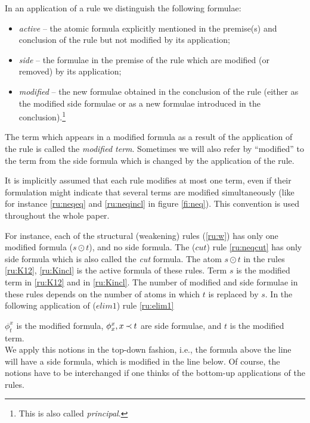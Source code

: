 \begin{DEFINITION} In an application of a rule we distinguish the following
formulae:
\begin{itemize}\MyLPar
\item {\em active} -- the atomic formula explicitly mentioned in the premise(s)
and conclusion of the rule but not modified by its application;
\item {\em side} -- the formulae in the premise of the rule which are modified
(or removed) by its application;
\item {\em modified} -- the new formulae obtained in the conclusion of the rule
(either as the modified side formulae or as a new formulae introduced in the 
conclusion).\footnote{This is also called {\em principal}.}
\end{itemize}
\end{DEFINITION}
\noindent
The term which appears in a modified formula as a 
result of the application of the rule is called the {\em modified
term}. Sometimes we will also refer by ``modified'' to the term from the side
formula which is changed by the application of the rule.

It is implicitly assumed that each rule modifies at most one term, even if
their formulation might indicate that several terms are modified
simultaneously (like for instance \ref{ru:neqeq} and \ref{ru:neqincl} in figure \ref{fi:neq}). This
convention is used throughout the whole paper.
\begin{EXAMPLE}
For instance, each of the structural (weakening) rules (\ref{ru:w}) 
has only one modified formula ($s\odot t$), and no side formula.
The ($cut$) rule \ref{ru:neqcut} has only side formula which is
also called the {\em cut} formula. The atom $s\odot t$ in the rules \ref{ru:K12}, 
\ref{ru:Kincl} is the active formula of these rules. 
Term $s$ is the modified term in
\ref{ru:K12} and in \ref{ru:Kincl}. The number of modified and side formulae in
these rules depends on the number of atoms in which $t$ is replaced by $s$. 
In the following application of ($elim1$) rule \ref{ru:elim1}
\begin{center}
\end{center}
\noindent $\phi_t^x$ is the modified formula, $\phi_x^x, x\mathbin{\prec} t$ are side formulae, 
and $t$ is the modified term.\\
We apply this notions in the top-down fashion, i.e., the formula above the
line will have a side formula, which is modified in the line below. Of
course, the notions have to be interchanged if one thinks of the bottom-up
applications of the rules.
\end{EXAMPLE}

